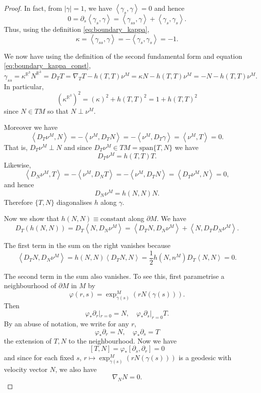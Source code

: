 \documentclass[10pt]{amsart}
\newcommand{\IP}[2]{\left< #1 , #2 \right>}
\newcommand{\R}{\ensuremath{\mathbb{R}}}
\theoremstyle{remark}
\begin{document}
\begin{proof}
In fact, from \(|\gamma| = 1\), we have \(\IP{\gamma_s}{\gamma} = 0\) and hence
\[
0 = \partial_s \IP{\gamma_s}{\gamma} = \IP{\gamma_{ss}}{\gamma} + \IP{\gamma_s}{\gamma_s}.
\]
Thus, using the definition \eqref{eq:boundary_kappa},
\begin{equation}
\label{eq:boundary_kappa_const}
\kappa = \IP{\gamma_{ss}}{\gamma} = -\IP{\gamma_s}{\gamma_s} = -1.
\end{equation}


We now have using the definition of the second fundamental form and equation \eqref{eq:boundary_kappa_const},
\[
\gamma_{ss} = \kappa^{\R^3} N^{\R^3} = D_T T = \nabla_T T - h(T, T)\nu^M = \kappa N - h(T, T) \nu^M = -N - h(T, T) \nu^M.
\]
In particular,
\[
(\kappa^{\R^3})^2 = (\kappa)^2 + h(T, T)^2 = 1 + h(T, T)^2
\]
since \(N \in TM\) so that \(N \perp \nu^M\).

Moreover we have
\[
\IP{D_T \nu^M}{N} = - \IP{\nu^M}{D_T N} = -\IP{\nu^M}{D_T \gamma} = \IP{\nu^M}{T} = 0.
\]
That is, \(D_T \nu^M \perp N\) and since \(D_T \nu^M \in TM = \text{span} \{T, N\}\) we have
\[
D_T \nu^M = h(T, T) T.
\]
Likewise,
\[
\IP{D_{N} \nu^M}{T} = -\IP{\nu^M}{D_{N} T} = -\IP{\nu^M}{D_T N} = \IP{D_T \nu^M}{N} = 0,
\]
and hence
\[
D_{N} \nu^M = h(N, N) N.
\]
Therefore \(\{T, N\}\) diagonalises \(h\) along \(\gamma\).

Now we show that \(h(N, N) \equiv \text{constant}\) along \(\partial M\). We have
\[
D_T \left(h(N, N)\right) = D_T \IP{N}{D_{N} \nu^M} = \IP{D_T N}{D_{N} \nu^M} + \IP{N}{D_T D_{N} \nu^M}.
\]

The first term in the sum on the right vanishes because
\[
\IP{D_T N}{D_{N} \nu^M} = h(N, N) \IP{D_T N}{N} = \frac{1}{2} h(N, n^M) D_T \IP{N}{N} = 0.
\]

The second term in the sum also vanishes. To see this, first parametrise a neighbourhood of \(\partial M\) in \(M\) by
\[
\varphi(r, s) = \exp^M_{\gamma(s)} (r N(\gamma(s))).
\]
Then
\[
\varphi_{\ast} \partial_r |_{r=0} = N, \quad \varphi_{\ast} \partial_s |_{r=0} T.
\]
By an abuse of notation, we write for any \(r\),
\[
\varphi_{\ast} \partial_r = N, \quad \varphi_{\ast} \partial_s = T
\]
the extension of \(T, N\) to the neighbourhood. Now we have
\[
[T, N] = \varphi_{\ast} [\partial_s, \partial_r] = 0
\]
and since for each fixed \(s\), \(r \mapsto \exp^M_{\gamma(s)} (rN(\gamma(s)))\) is a geodesic with velocity vector \(N\), we also have
\[
\nabla_{N} N = 0.
\]


\end{proof}
\end{document}
